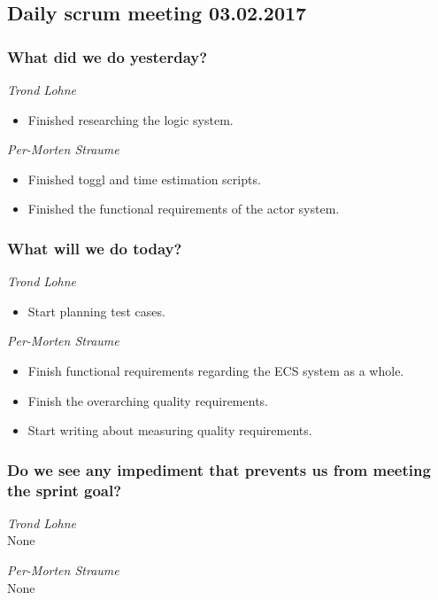 \documentclass{article}
\begin{document}
\begin{center}
\subsection*{Daily scrum meeting 03.02.2017}
\end{center}
\bigskip


\subsubsection*{What did we do yesterday?}

\noindent\textit{Trond Lohne}
\begin{itemize}
    \item
    Finished researching the logic system.

\end{itemize}

\medskip

\noindent\textit{Per-Morten Straume}
\begin{itemize}
    \item
    Finished toggl and time estimation scripts.

    \item
    Finished the functional requirements of the actor system.
\end{itemize}

\subsubsection*{What will we do today?}

\noindent\textit{Trond Lohne}
\begin{itemize}
    \item
    Start planning test cases.
\end{itemize}

\medskip

\noindent\textit{Per-Morten Straume}
\begin{itemize}
    \item
    Finish functional requirements regarding the ECS system as a whole.

    \item
    Finish the overarching quality requirements.

    \item
    Start writing about measuring quality requirements.
\end{itemize}


\subsubsection*{Do we see any impediment that prevents us from meeting the sprint goal?}

\noindent\textit{Trond Lohne}\\
None

\medskip

\noindent\textit{Per-Morten Straume}\\
None
\end{document}

